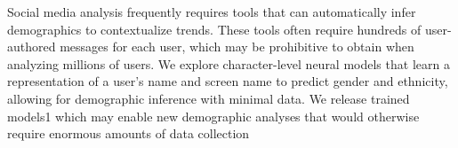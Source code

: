 Social media analysis frequently requires tools that can automatically infer demographics to contextualize trends. These tools often require hundreds of user-authored messages for each user, which may be prohibitive to obtain when analyzing millions of users. We explore character-level neural models that learn a representation of a user's name and screen name to predict gender and ethnicity, allowing for demographic inference with minimal data. We release trained models1 which may enable new demographic analyses that would otherwise require enormous amounts of data collection
